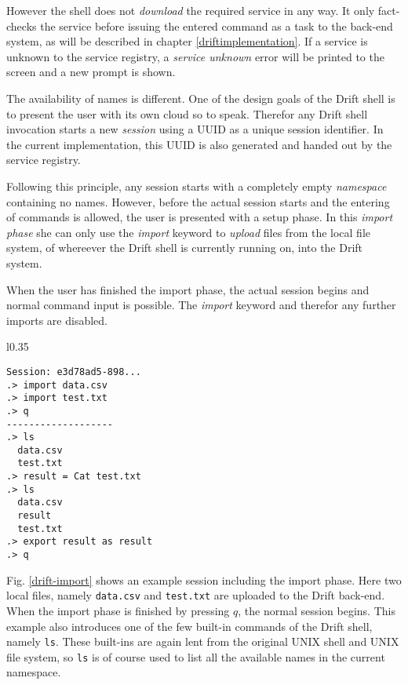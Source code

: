 However the shell does not \textit{download} the required service
in any way. It only fact-checks the service before issuing the
entered command as a task to the back-end system, as will be
described in chapter \ref{driftimplementation}.
If a service is unknown to the service registry, a
\textit{service unknown} error will be printed to the screen
and a new prompt is shown.
\newline

The availability of names is different. One of the design goals
of the Drift shell is to present the user with its own cloud so
to speak. Therefor any Drift shell invocation starts a new
\textit{session} using a UUID as a unique session identifier.
In the current implementation, this UUID is also generated and
handed out by the service registry.

Following this principle, any session starts with a
completely empty \textit{namespace} containing no names. However,
before the actual session starts and the entering of commands is allowed,
the user is presented with a setup phase. In this \textit{import phase}
she can only use the \textit{import} keyword to \textit{upload}
files from the local file system, of whereever the Drift shell is currently
running on, into the Drift system.

When the user has finished the import phase, the actual session
begins and normal command input is possible. The \textit{import}
keyword and therefor any further imports are disabled.

\begin{wrapfigure}{l}{0.35\textwidth}
  \begin{lstlisting}
Session: e3d78ad5-898...
.> import data.csv
.> import test.txt
.> q
-------------------
.> ls
  data.csv
  test.txt
.> result = Cat test.txt
.> ls
  data.csv
  result
  test.txt
.> export result as result
.> q

  \end{lstlisting}
  \caption{Example of a short Drift session.}
  \label{drift-import}
\end{wrapfigure}

Fig. \ref{drift-import} shows an example session including the import
phase. Here two local files, namely \texttt{data.csv} and
\texttt{test.txt} are uploaded to the Drift back-end. When the
import phase is finished by pressing $q$, the normal session
begins. This example also introduces one of the few built-in
commands of the Drift shell, namely \texttt{ls}. These built-ins
are again lent from the original UNIX shell and UNIX file system,
so \texttt{ls} is of course used to list all the available names
in the current namespace.


